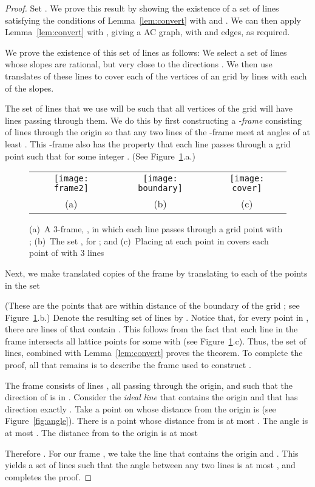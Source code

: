 \documentclass{patmorin}
\newcommand{\figlabel}[1]{\label{fig:#1}}
\newcommand{\figref}[1]{\mbox{Figure~\ref{fig:#1}}}
\newcommand{\lemref}[1]{Lemma~\ref{lem:#1}}
\begin{document}
\begin{proof}
Set .  We prove this result by showing the
existence of a set of  lines satisfying the conditions of
\lemref{convert} with  and .  We can then
apply \lemref{convert} with , giving a AC
graph, with  and  edges, as required.

We prove the existence of this set of lines as follows: We select a set
of  lines whose slopes are rational, but very close to the directions
.  We then use 
translates of these  lines to cover each of the vertices of an  grid by lines with each of the  slopes.

The set of lines that we use will be such that all  vertices of
the  grid  will have
 lines passing through them.  We do this by first constructing a
\emph{-frame}  consisting of  lines through the origin so that
any two lines of the -frame meet at angles of at least .
This -frame also has the property that each line passes through a
grid point  such that  for some integer . (See \figref{bigproof}.a.)

\begin{figure}
  \begin{center}
    \begin{tabular}{ccc}
    \texttt{[image: frame2]}
    &
    \texttt{[image: boundary]}
    &
    \texttt{[image: cover]} \\
    (a) & (b) & (c)
    \end{tabular}
  \end{center}
  \caption{(a)~A 3-frame, , in which each line passes through a grid point
 with ; 
           (b)~The set , for ; and 
           (c)~Placing  at each point in  covers each point of
 with 3 lines}
  \figlabel{bigproof}
\end{figure}

\newcommand{\floor}[1]{\lfloor #1 \rfloor}

Next, we make  translated copies of the frame  by
translating  to each of the points in the set

(These are the points that are within distance  of the boundary of
the grid ; see \figref{bigproof}.b.)  Denote the resulting set of
 lines by .  Notice that, for every point  in
, there are  lines of  that contain .  This follows from
the fact that each line in the frame  intersects all lattice points
 for some  with 
(see \figref{bigproof}.c).  Thus, the set  of lines, combined with
\lemref{convert} proves the theorem.  To complete the proof, all that
remains is to describe the frame  used to construct .

The frame  consists of  lines , all passing
through the origin, and such that the direction of  is in .  Consider the \emph{ideal line} 
that contains the origin and that has direction exactly .
Take a point  on  whose distance from the origin is
 (see \figref{angle}).  There is a point
 whose distance from  is at most .
The angle  is at most .  The distance from 
to the origin is at most

Therefore .  For our frame , we take the line
 that contains the origin and .  This yields a set  of lines
such that the angle between any two lines is at most , and
completes the proof.
\end{proof}
\end{document}
